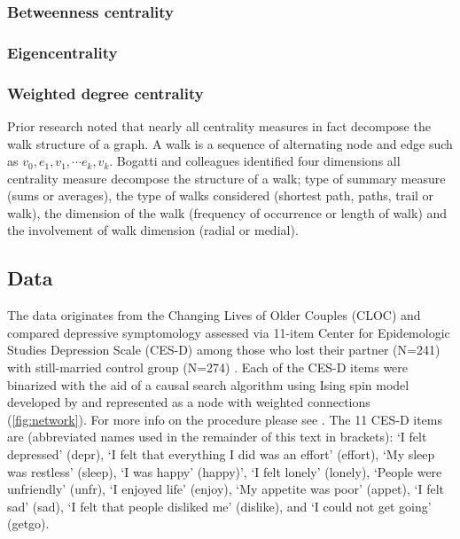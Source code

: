\documentclass[twoside, twocolumn]{article}
\begin{document}
	\subsubsection*{Betweenness centrality}

	\subsubsection*{Eigencentrality}

	\subsubsection*{Weighted degree centrality}





	Prior research noted that nearly all centrality measures in fact decompose the walk structure of a graph. A walk is a  sequence of alternating node and edge such as $v_0, e_1, v_1, \cdots e_k, v_k$\cite{Borgatti2005, Borgatti2006}. Bogatti and colleagues identified four dimensions all centrality measure decompose the structure of a walk\cite{Borgatti2006}; type of summary measure (sums or averages), the type of walks considered (shortest path, paths, trail or walk), the dimension of the walk (frequency of occurrence or length of walk) and the involvement of walk dimension (radial or medial).




	\subsection{Data}
	\label{sec:psycho}
	The data originates from the Changing Lives of Older Couples (CLOC) and compared depressive symptomology	 assessed via 11-item Center for Epidemologic Studies Depression Scale (CES-D) among those who lost their partner (N=241) with still-married control group (N=274) \cite{Fried2015}. Each of the CES-D items were binarized with the aid of a causal search algorithm using Ising spin model developed by \cite{VanBorkulo2014} and represented as a node with weighted connections (\ref{fig:network}). For more info on the procedure please see \cite{VanBorkulo2014, Epskamp2017, Fried2015}. The 11 CES-D items are (abbreviated names used in the remainder of this text in brackets): `I felt depressed' (depr), `I felt that everything I did was an effort' (effort), `My sleep was restless' (sleep), `I was happy' (happy)', `I felt lonely' (lonely), `People were unfriendly' (unfr), `I enjoyed life' (enjoy), `My appetite was poor' (appet), `I felt sad' (sad), `I felt that people disliked me' (dislike), and `I could not get going' (getgo).
\end{document}
